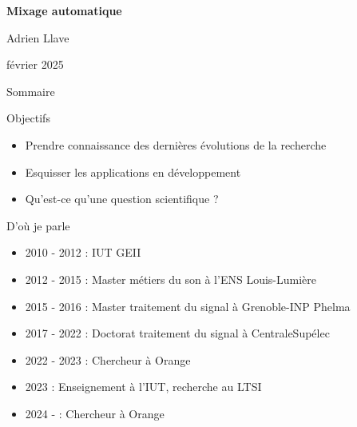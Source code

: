 \documentclass[9pt, aspectratio=169]{beamer}
\title{}
\author{Adrien Llave}
\institute{CentraleSupélec/IETR}
\begin{document}
\begin{withoutheadline}
\begin{withoutfootline}
\begin{frame}
	\vspace{0.5cm}
	\textbf{\large Mixage automatique}
	
	\vspace{0.7cm}
	{\small Adrien Llave}

	\footnotesize février 2025
\end{frame}
\end{withoutfootline}
\end{withoutheadline}

\begin{withoutheadline}
\begin{frame}{Sommaire}
	\tableofcontents[sectionstyle=show,subsectionstyle=show/shaded/hide,subsubsectionstyle=show/shaded/hide]
\end{frame}
\end{withoutheadline}


\begin{frame}{Objectifs} %
\begin{center}

    \begin{itemize}
        \item Prendre connaissance des dernières évolutions de la recherche
        \item Esquisser les applications en développement
        \item Qu'est-ce qu'une question scientifique ?

    \end{itemize}
\end{center}
\end{frame}

\begin{frame}{D'où je parle} %
\begin{center}

    \begin{itemize}
        \item 2010 - 2012 : IUT GEII
        \item 2012 - 2015 : Master métiers du son à l'ENS Louis-Lumière
        \item 2015 - 2016 : Master traitement du signal à Grenoble-INP Phelma
        \item 2017 - 2022 : Doctorat traitement du signal à CentraleSupélec
        \item 2022 - 2023 : Chercheur à Orange
        \item 		 2023 : Enseignement à l'IUT, recherche au LTSI
        \item 2024 -      : Chercheur à Orange
    \end{itemize}
\end{center}
\end{frame}
\end{document}
